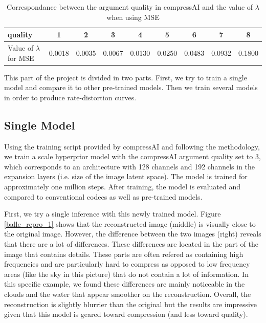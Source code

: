\begin{table}[]
    \centering
    \begin{tabular}{|l|c|c|c|c|c|c|c|c|}
    \hline
    \textsf{quality}                      & 1 & 2 & 3 & 4 & 5 & 6 & 7 & 8 \\ \hline
    Value of \(\lambda\) for MSE & 0.0018 & 0.0035 & 0.0067 & 0.0130 & 0.0250 & 0.0483 & 0.0932 & 0.1800 \\ \hline
    \end{tabular}
    \caption{Correspondance between the argument \textsf{quality} in compressAI and the value of \(\lambda\) when using MSE}
    \label{tab}
\end{table}

This part of the project is divided in two parts. First, we try to train a single model and compare it to other pre-trained models. Then we train several models in order to produce rate-distortion curves.

\subsection{Single Model}
Using the training script provided by compressAI and following the methodology, we train a scale hyperprior model with the compressAI argument \textsf{quality} set to 3, which corresponds to an architecture with 128 channels and 192 channels in the expansion layers (i.e. size of the image latent space). The model is trained for approximately one million steps. 
After training, the model is evaluated and compared to conventional codecs as well as pre-trained models.

First, we try a single inference with this newly trained model. Figure \ref{balle_repro_1} shows that the reconstructed image (middle) is visually close to the original image. However, the difference between the two images (right) reveals that there are a lot of differences. These differences are located in the part of the image that contains details. These parts are often refered as containing high frequencies and are particularly hard to compress as opposed to low frequency areas (like the sky in this picture) that do not contain a lot of information. In this specific example, we found these differences are mainly noticeable in the clouds and the water that appear smoother on the reconstruction. Overall, the reconstruction is slightly blurrier than the original but the results are impressive given that this model is geared toward compression (and less toward quality).

